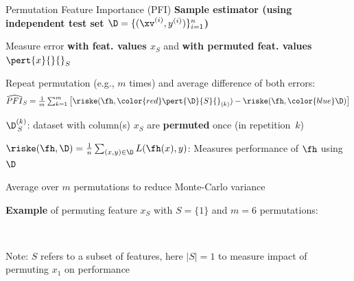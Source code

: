\documentclass[10pt,compress,t,notes=noshow, xcolor=table]{beamer}
\begin{document}
\begin{framev}[align=top]{Permutation Feature Importance (PFI) }
\textbf{Sample estimator (using independent test set $\D=\{(\xv^{(i)},y^{(i)})\}_{i=1}^{n}$)}
\begin{itemizeM}
\item Measure error {\color{blue}\textbf{with feat. values $x_S$}} and {\color{red}\textbf{with permuted feat. values $\pert{x}{}{}_S$}}
\item Repeat permutation (e.g., $m$ times) and average difference of both errors:
$$
\widehat{PFI}_S = \tfrac{1}{m}  \textstyle\sum\nolimits_{k = 1}^{m} \big[ \riske (\fh, {\color{red}\pert{\D}{S}{}_{(k)}}) - \riske (\fh, {\color{blue}\D}) \big]
$$
\begin{itemizeS}
\item $\D^{(k)}_{\,S}$: dataset with column(s) $x_S$ are \textbf{permuted} once (in repetition\ $k$)
\item $\riske(\fh, \D) = \frac{1}{n} \sum\nolimits_{(x, y) \in \D}  L(\fh(x), y)$: Measures performance of $\fh$ using $\D$
\item Average over $m$ permutations to reduce Monte-Carlo variance
\end{itemizeS}
\end{itemizeM}
\spacer[0.25]
\textbf{Example} of permuting feature $x_S$ with $S = \{1\}$ and $m=6$ permutations:
{\centering
{}\\
\begin{scriptsize}
Note: $S$ refers to a subset of features, here $|S|=1$ to measure impact of permuting $x_1$ on performance
\end{scriptsize}
\par}
\end{framev}
\end{document}
